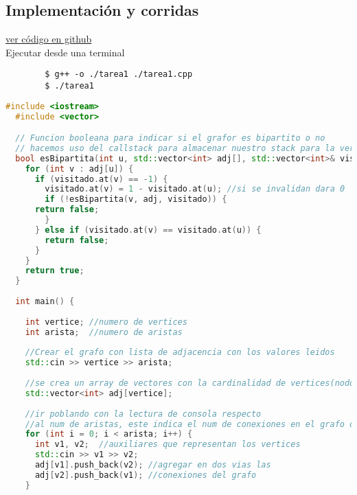 \documentclass{article}
\begin{document}
\subsection{Implementación y corridas}

\href{https://github.com/luisballado/ADA/blob/main/practice_code/tarea1.cpp}{ver código en github}\\

Ejecutar desde una terminal

\begin{commandline}
	\begin{verbatim}
		$ g++ -o ./tarea1 ./tarea1.cpp
		$ ./tarea1
	\end{verbatim}
\end{commandline}

\begin{file}
\begin{lstlisting}[language=C++]
  #include <iostream>
  #include <vector>

  // Funcion booleana para indicar si el grafor es bipartito o no
  // hacemos uso del callstack para almacenar nuestro stack para la version recursiva
  bool esBipartita(int u, std::vector<int> adj[], std::vector<int>& visitado) {
    for (int v : adj[u]) {
      if (visitado.at(v) == -1) {
        visitado.at(v) = 1 - visitado.at(u); //si se invalidan dara 0
        if (!esBipartita(v, adj, visitado)) {
	  return false;
        }
      } else if (visitado.at(v) == visitado.at(u)) {
        return false;
      }
    }
    return true;
  }
  
  int main() {
    
    int vertice; //numero de vertices
    int arista;  //numero de aristas
    
    //Crear el grafo con lista de adjacencia con los valores leidos
    std::cin >> vertice >> arista;
    
    //se crea un array de vectores con la cardinalidad de vertices(nodos)
    std::vector<int> adj[vertice];
    
    //ir poblando con la lectura de consola respecto
    //al num de aristas, este indica el num de conexiones en el grafo decimos que existe una conexion entre el nodo 0 y nodo 1 de la siguiente forma: 0 1
    for (int i = 0; i < arista; i++) {
      int v1, v2;  //auxiliares que representan los vertices
      std::cin >> v1 >> v2; 
      adj[v1].push_back(v2); //agregar en dos vias las 
      adj[v2].push_back(v1); //conexiones del grafo
    }
    

\end{lstlisting}
\end{file}
\end{document}
